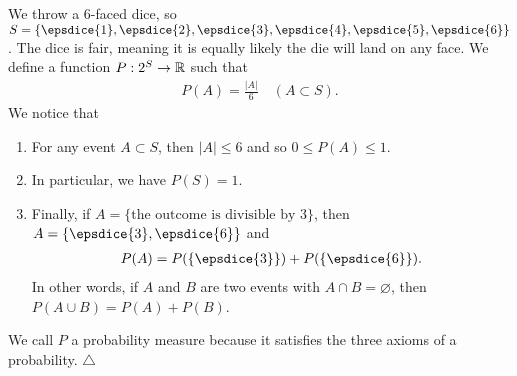 \begin{example}\label{Ex:DiceProbability}
We throw a 6-faced dice, so $S = \{ \epsdice{1}, \epsdice{2}, \epsdice{3}, \epsdice{4}, \epsdice{5} , \epsdice{6} \}$. The dice is fair, meaning it is equally likely the die will land on any face. We define a function $P : 2^S \rightarrow \mathbb{R}$ such that
	\begin{align*}
	P (A) = \frac{|A|}{6} \quad (A \subset S).
	\end{align*}
We notice that
	\begin{enumerate}[label=\alph*)]
	\item For any event $A \subset S$, then $|A| \leq 6$ and so $0 \leq P (A) \leq 1$.
	\item In particular, we have $P(S) = 1$.
	\item\label{Ex:DiceProbDecompositionAtomic} Finally, if $A = \{ \text{the outcome is divisible by 3} \}$, then $A = \{ \epsdice{3} , \epsdice{6} \}$ and
		\begin{align*}
		P (A) = P (\{ \epsdice{3} \} ) + P (\{ \epsdice{6} \}) .
		\end{align*}
	In other words, if $A$ and $B$ are two events with $A \cap B = \varnothing$, then $P (A \cup B ) = P (A) + P (B)$.
	\end{enumerate}
We call $P$ a probability measure because it satisfies the three axioms of a probability. \hfill $\triangle$
\end{example}

\vspace*{16pt}

